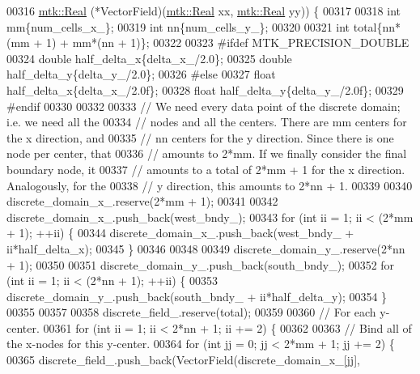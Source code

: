 \begin{DoxyCode}
00316   \hyperlink{group__c01-roots_gac080bbbf5cbb5502c9f00405f894857d}{mtk::Real} (*VectorField)(\hyperlink{group__c01-roots_gac080bbbf5cbb5502c9f00405f894857d}{mtk::Real} xx, \hyperlink{group__c01-roots_gac080bbbf5cbb5502c9f00405f894857d}{mtk::Real} yy)) \{
00317 
00318   \textcolor{keywordtype}{int} mm\{num\_cells\_x\_\};
00319   \textcolor{keywordtype}{int} nn\{num\_cells\_y\_\};
00320 
00321   \textcolor{keywordtype}{int} total\{nn*(mm + 1) + mm*(nn + 1)\};
00322 
00323 \textcolor{preprocessor}{  #ifdef MTK\_PRECISION\_DOUBLE}
00324   \textcolor{keywordtype}{double} half\_delta\_x\{delta\_x\_/2.0\};
00325   \textcolor{keywordtype}{double} half\_delta\_y\{delta\_y\_/2.0\};
00326 \textcolor{preprocessor}{  #else}
00327   \textcolor{keywordtype}{float} half\_delta\_x\{delta\_x\_/2.0f\};
00328   \textcolor{keywordtype}{float} half\_delta\_y\{delta\_y\_/2.0f\};
00329 \textcolor{preprocessor}{  #endif}
00330 
00332 
00333   \textcolor{comment}{// We need every data point of the discrete domain; i.e. we need all the}
00334   \textcolor{comment}{// nodes and all the centers. There are mm centers for the x direction, and}
00335   \textcolor{comment}{// nn centers for the y direction. Since there is one node per center, that}
00336   \textcolor{comment}{// amounts to 2*mm. If we finally consider the final boundary node, it}
00337   \textcolor{comment}{// amounts to a total of 2*mm + 1 for the x direction. Analogously, for the}
00338   \textcolor{comment}{// y direction, this amounts to 2*nn + 1.}
00339 
00340   discrete\_domain\_x\_.reserve(2*mm + 1);
00341 
00342   discrete\_domain\_x\_.push\_back(west\_bndy\_);
00343   \textcolor{keywordflow}{for} (\textcolor{keywordtype}{int} ii = 1; ii < (2*mm + 1); ++ii) \{
00344     discrete\_domain\_x\_.push\_back(west\_bndy\_ + ii*half\_delta\_x);
00345   \}
00346 
00348 
00349   discrete\_domain\_y\_.reserve(2*nn + 1);
00350 
00351   discrete\_domain\_y\_.push\_back(south\_bndy\_);
00352   \textcolor{keywordflow}{for} (\textcolor{keywordtype}{int} ii = 1; ii < (2*nn + 1); ++ii) \{
00353     discrete\_domain\_y\_.push\_back(south\_bndy\_ + ii*half\_delta\_y);
00354   \}
00355 
00357 
00358   discrete\_field\_.reserve(total);
00359 
00360   \textcolor{comment}{// For each y-center.}
00361   \textcolor{keywordflow}{for} (\textcolor{keywordtype}{int} ii = 1; ii < 2*nn + 1; ii += 2) \{
00362 
00363     \textcolor{comment}{// Bind all of the x-nodes for this y-center.}
00364     \textcolor{keywordflow}{for} (\textcolor{keywordtype}{int} jj = 0; jj < 2*mm + 1; jj += 2) \{
00365       discrete\_field\_.push\_back(VectorField(discrete\_domain\_x\_[jj],

\end{DoxyCode}
